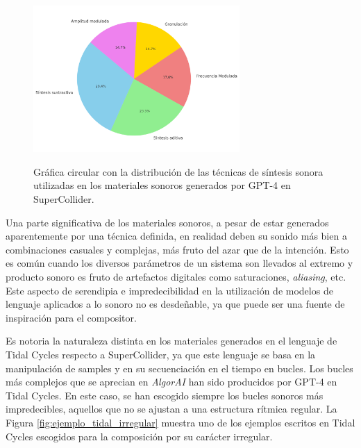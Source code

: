 \begin{figure}[H]
    \caption[Gráfica circular con la distribución de las técnicas de síntesis sonora utilizadas en los materiales sonoros generados por GPT-4 en SuperCollider]{Gráfica circular con la distribución de las técnicas de síntesis sonora utilizadas en los materiales sonoros generados por GPT-4 en SuperCollider.}
    \centering
    \includegraphics[width=0.7\textwidth]{./figuras/grafica_sintesis_gpt4_quesitos.png}
    \source{\propio}
    \label{fig:grafica_sintesis_gpt4}
\end{figure}

Una parte significativa de los materiales sonoros, a pesar de estar generados aparentemente por una técnica definida, en realidad deben su sonido más bien a combinaciones casuales y complejas, más fruto del azar que de la intención. Esto es común cuando los diversos parámetros de un sistema son llevados al extremo y producto sonoro es fruto de artefactos digitales como saturaciones, \emph{aliasing}, etc. Este aspecto de serendipia e impredecibilidad en la utilización de modelos de lenguaje aplicados a lo sonoro no es desdeñable, ya que puede ser una fuente de inspiración para el compositor.

Es notoria la naturaleza distinta en los materiales generados en el lenguaje de Tidal Cycles respecto a SuperCollider, ya que este lenguaje se basa en la manipulación de samples y en su secuenciación en el tiempo en bucles. Los bucles más complejos que se aprecian en \emph{AlgorAI} han sido producidos por GPT-4 en Tidal Cycles. En este caso, se han escogido siempre los bucles sonoros más impredecibles, aquellos que no se ajustan a una estructura rítmica regular. La Figura \ref{fig:ejemplo_tidal_irregular} muestra uno de los ejemplos escritos en Tidal Cycles escogidos para la composición por su carácter irregular.



